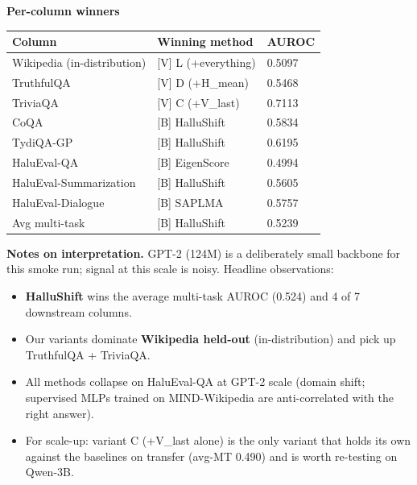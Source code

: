 \documentclass[10pt]{article}
\begin{document}
\vspace{0.2cm}
\noindent\textbf{Per-column winners}
\begin{table}[h!]
\centering
\small
\begin{tabular}{@{}lll@{}}
\toprule
\textbf{Column} & \textbf{Winning method} & \textbf{AUROC} \\
\midrule
Wikipedia (in-distribution) & [V] L (+everything) & 0.5097 \\
TruthfulQA & [V] D (+H\_mean) & 0.5468 \\
TriviaQA & [V] C (+V\_last) & 0.7113 \\
CoQA & [B] HalluShift & 0.5834 \\
TydiQA-GP & [B] HalluShift & 0.6195 \\
HaluEval-QA & [B] EigenScore & 0.4994 \\
HaluEval-Summarization & [B] HalluShift & 0.5605 \\
HaluEval-Dialogue & [B] SAPLMA & 0.5757 \\
Avg multi-task & [B] HalluShift & 0.5239 \\
\bottomrule
\end{tabular}
\end{table}
\vspace{0.2cm}
\noindent\textbf{Notes on interpretation.} GPT-2 (124M) is a deliberately small backbone for this smoke run; signal at this scale is noisy. Headline observations:
\begin{itemize}\setlength\itemsep{-2pt}
  \item \textbf{HalluShift} wins the average multi-task AUROC (0.524) and 4 of 7 downstream columns.
  \item Our variants dominate \textbf{Wikipedia held-out} (in-distribution) and pick up TruthfulQA + TriviaQA.
  \item All methods collapse on HaluEval-QA at GPT-2 scale (domain shift; supervised MLPs trained on MIND-Wikipedia are anti-correlated with the right answer).
  \item For scale-up: variant C (+V\_last alone) is the only variant that holds its own against the baselines on transfer (avg-MT 0.490) and is worth re-testing on Qwen-3B.
\end{itemize}
\end{document}
